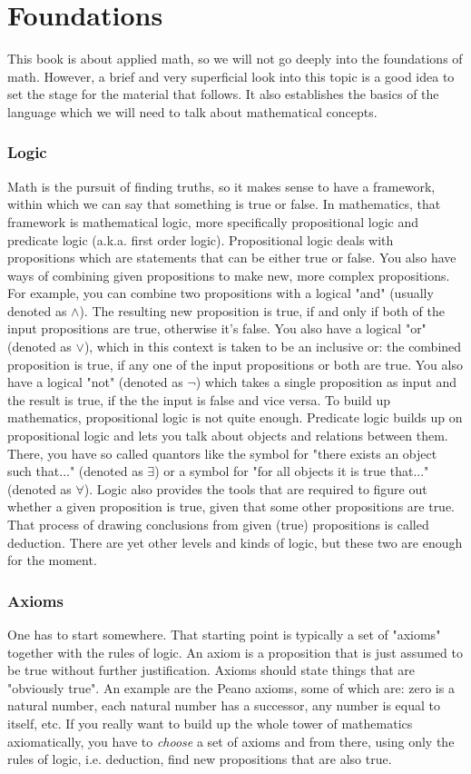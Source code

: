 \section{Foundations} 

This book is about applied math, so we will not go deeply into the foundations of math. However, a brief and very superficial look into this topic is a good idea to set the stage for the material that follows. It also establishes the basics of the language which we will need to talk about mathematical concepts.

\subsubsection{Logic}
Math is the pursuit of finding truths, so it makes sense to have a framework, within which we can say that something is true or false. In mathematics, that framework is mathematical logic, more specifically propositional logic and predicate logic (a.k.a. first order logic). Propositional logic deals with propositions which are statements that can be either true or false. You also have ways of combining given propositions to make new, more complex propositions. For example, you can combine two propositions with a logical "and" (usually denoted as $\wedge$). The resulting new proposition is true, if and only if both of the input propositions are true, otherwise it's false. You also have a logical "or" (denoted as $\vee$), which in this context is taken to be an inclusive or: the combined proposition is true, if any one of the input propositions or both are true. You also have a logical "not" (denoted as $\neg$) which takes a single proposition as input and the result is true, if the the input is false and vice versa. To build up mathematics, propositional logic is not quite enough. Predicate logic builds up on propositional logic and lets you talk about objects and relations between them. There, you have so called quantors like the symbol for "there exists an object such that..." (denoted as $\exists$) or a symbol for "for all objects it is true that..." (denoted as $\forall$). Logic also provides the tools that are required to figure out whether a given proposition is true, given that some other propositions are true. That process of drawing conclusions from given (true) propositions is called deduction. There are yet other levels and kinds of logic, but these two are enough for the moment.

\subsubsection{Axioms}
One has to start somewhere. That starting point is typically a set of "axioms" together with the rules of logic. An axiom is a proposition that is just assumed to be true without further justification. Axioms should state things that are "obviously true". An example are the Peano axioms, some of which are: zero is a natural number, each natural number has a successor, any number is equal to itself, etc. If you really want to build up the whole tower of mathematics axiomatically, you have to \emph{choose} a set of axioms and from there, using only the rules of logic, i.e. deduction, find new propositions that are also true.

